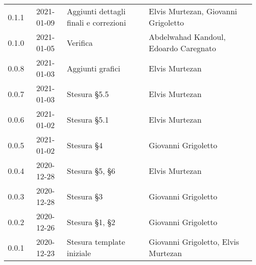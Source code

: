 {\begin{longtable}{ c c  C{3.5cm}  C{3.5cm}  c }
        0.1.1  & 
        2021-01-09 & 
        Aggiunti dettagli finali e correzioni & 
        Elvis Murtezan, Giovanni Grigoletto  & 
        \responsabile{} \\

        0.1.0  & 
        2021-01-05 & 
        Verifica & 
        Abdelwahad Kandoul, Edoardo Caregnato  & 
        \verificatore{} \\

        0.0.8  & 
        2021-01-03 & 
        Aggiunti grafici & 
        Elvis Murtezan  & 
        \responsabile{} \\

        0.0.7  & 
        2021-01-03 & 
        Stesura §5.5 &
        Elvis Murtezan  & 
        \responsabile{} \\

        0.0.6  & 
        2021-01-02 & 
        Stesura §5.1 & 
        Elvis Murtezan  & 
        \responsabile{} \\

        0.0.5  & 
        2021-01-02 & 
        Stesura §4 & 
        Giovanni Grigoletto & 
        \responsabile{} \\

        0.0.4  & 
        2020-12-28 & 
        Stesura §5, §6 & 
        Elvis Murtezan  & 
        \responsabile{} \\

        0.0.3  & 
        2020-12-28 & 
        Stesura §3 & 
        Giovanni Grigoletto & 
        \responsabile{} \\
        
        0.0.2  & 
        2020-12-26 & 
        Stesura §1, §2 & 
        Giovanni Grigoletto & 
        \responsabile{} \\

        0.0.1  & 
        2020-12-23 & 
        Stesura template iniziale & 
        Giovanni Grigoletto, Elvis Murtezan & 
        \responsabile{} \\
    \end{longtable}
}